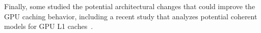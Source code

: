 



Finally, some studied the potential architectural changes that could improve the GPU caching
behavior, including a recent study that analyzes potential coherent models for GPU L1
caches~\cite{singh2013cache}.
